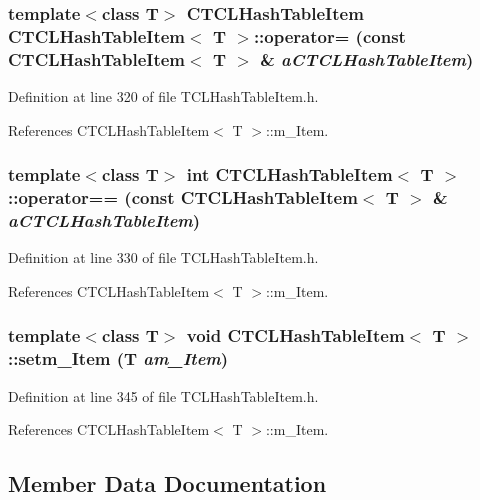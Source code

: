 \subsubsection{\setlength{\rightskip}{0pt plus 5cm}template$<$class T$>$ CTCLHash\-Table\-Item CTCLHash\-Table\-Item$<$ T $>$::operator= (const CTCLHash\-Table\-Item$<$ T $>$ \& {\em a\-CTCLHash\-Table\-Item})\hspace{0.3cm}{\tt  [inline]}}\label{classCTCLHashTableItem_a3}




Definition at line 320 of file TCLHash\-Table\-Item.h.

References CTCLHash\-Table\-Item$<$ T $>$::m\_\-Item.
\subsubsection{\setlength{\rightskip}{0pt plus 5cm}template$<$class T$>$ int CTCLHash\-Table\-Item$<$ T $>$::operator== (const CTCLHash\-Table\-Item$<$ T $>$ \& {\em a\-CTCLHash\-Table\-Item})\hspace{0.3cm}{\tt  [inline]}}\label{classCTCLHashTableItem_a4}




Definition at line 330 of file TCLHash\-Table\-Item.h.

References CTCLHash\-Table\-Item$<$ T $>$::m\_\-Item.
\subsubsection{\setlength{\rightskip}{0pt plus 5cm}template$<$class T$>$ void CTCLHash\-Table\-Item$<$ T $>$::setm\_\-Item (T {\em am\_\-Item})\hspace{0.3cm}{\tt  [inline, protected]}}\label{classCTCLHashTableItem_b0}




Definition at line 345 of file TCLHash\-Table\-Item.h.

References CTCLHash\-Table\-Item$<$ T $>$::m\_\-Item.

\subsection{Member Data Documentation}
